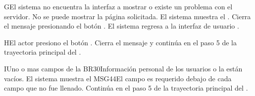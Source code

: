 \begin{UCtrayectoriaA}{G}{El sistema no encuentra la interfaz a mostrar o existe un problema con el servidor.}
    \UCpaso No se puede mostrar la página solicitada.
    \UCpaso El sistema muestra el .
    \UCpaso[\UCactor] Cierra el mensaje presionando el botón .
    \UCpaso El sistema regresa a la interfaz de usuario .
\end{UCtrayectoriaA}
\begin{UCtrayectoriaA}{H}{El actor presiono el botón .}
	\UCpaso Cierra el mensaje y continúa en el paso 5 de la trayectoria principal del .	
\end{UCtrayectoriaA}
\begin{UCtrayectoriaA}{I}{Uno o mas campos de la {BR30}{Información personal de los usuarios} o la  están vacíos.}
	\UCpaso El sistema muestra el {MSG44}{El campo es requerido} debajo de cada campo que no fue llenado. 
	\UCpaso	Continúa en el paso 5 de la trayectoria principal del .
\end{UCtrayectoriaA}